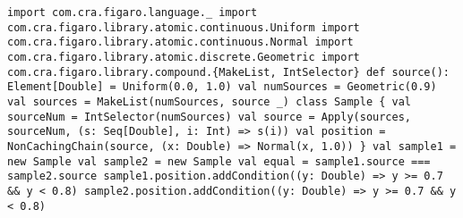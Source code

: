 \begin{flushleft}
\texttt{import com.cra.figaro.language.\_
\newline import com.cra.figaro.library.atomic.continuous.Uniform 
\newline import com.cra.figaro.library.atomic.continuous.Normal 
\newline import com.cra.figaro.library.atomic.discrete.Geometric 
\newline import com.cra.figaro.library.compound.\{MakeList, IntSelector\}
\newline 
\newline def source(): Element[Double] = Uniform(0.0, 1.0)
\newline 
\newline val numSources = Geometric(0.9)
\newline 
\newline val sources = MakeList(numSources, source \_)
\newline 
\newline class Sample \{
\newline \tab val sourceNum = IntSelector(numSources)
\newline \tab val source =
\newline \tab Apply(sources, sourceNum, (s: Seq[Double], i: Int) => s(i))
\newline \tab val position =
\newline \tab NonCachingChain(source, (x: Double) => Normal(x, 1.0))
\newline \}
\newline 
\newline val sample1 = new Sample 
\newline val sample2 = new Sample
\newline 
\newline val equal = sample1.source === sample2.source 
\newline 
\newline sample1.position.addCondition((y: Double) => y >= 0.7 \&\& y < 0.8)
\newline sample2.position.addCondition((y: Double) => y >= 0.7 \&\& y < 0.8) 
}
\end{flushleft}

